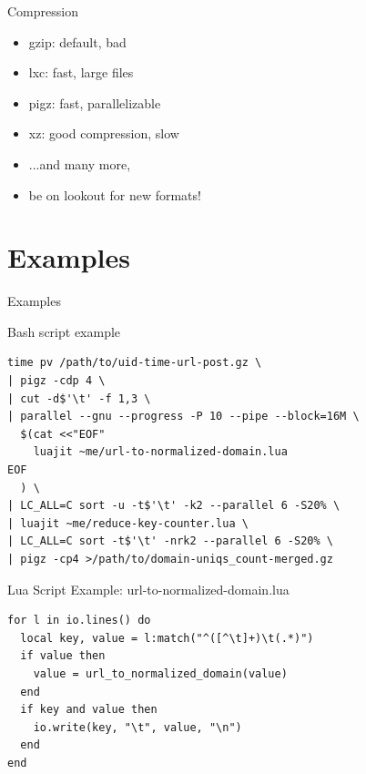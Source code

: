 \documentclass[handout]{beamer}
\begin{document}

\begin{frame}{Compression}

\begin{itemize}
\item gzip: default, bad
\item lxc: fast, large files
\item pigz: fast, parallelizable
\item xz: good compression, slow
\item ...and many more,
\item be on lookout for new formats!
\end{itemize}

\end{frame}


\section{Examples}


\begin{frame}
\huge Examples
\end{frame}


\begin{frame}[fragile]{Bash script example}

\begin{verbatim}
time pv /path/to/uid-time-url-post.gz \
| pigz -cdp 4 \
| cut -d$'\t' -f 1,3 \
| parallel --gnu --progress -P 10 --pipe --block=16M \
  $(cat <<"EOF"
    luajit ~me/url-to-normalized-domain.lua
EOF
  ) \
| LC_ALL=C sort -u -t$'\t' -k2 --parallel 6 -S20% \
| luajit ~me/reduce-key-counter.lua \
| LC_ALL=C sort -t$'\t' -nrk2 --parallel 6 -S20% \
| pigz -cp4 >/path/to/domain-uniqs_count-merged.gz
\end{verbatim}

\end{frame}


\begin{frame}[fragile]{Lua Script Example: url-to-normalized-domain.lua}

\begin{verbatim}
for l in io.lines() do
  local key, value = l:match("^([^\t]+)\t(.*)")
  if value then
    value = url_to_normalized_domain(value)
  end
  if key and value then
    io.write(key, "\t", value, "\n")
  end
end
\end{verbatim}

\end{frame}
\end{document}
